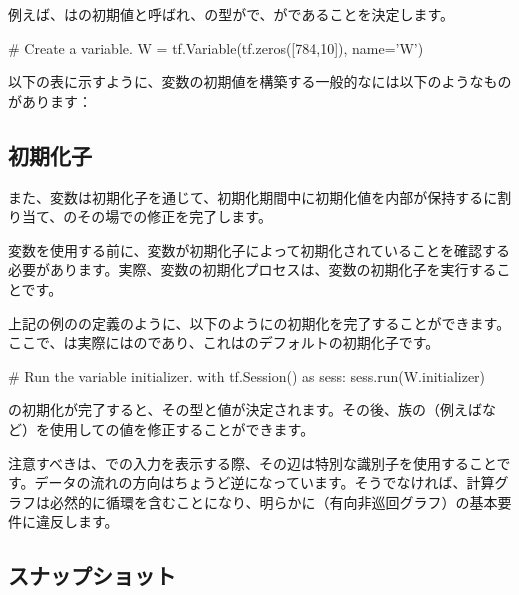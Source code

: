 \begin{content}
例えば、はの初期値と呼ばれ、の型がで、が\code{[784, 10]}であることを決定します。

\begin{leftbar}
\begin{python}
# Create a variable.
W = tf.Variable(tf.zeros([784,10]), name='W')
\end{python}
\end{leftbar}

以下の表に示すように、変数の初期値を構築する一般的なには以下のようなものがあります：

\subsection{初期化子}

また、変数は初期化子を通じて、初期化期間中に初期化値を内部が保持するに割り当て、のその場での修正を完了します。

変数を使用する前に、変数が初期化子によって初期化されていることを確認する必要があります。実際、変数の初期化プロセスは、変数の初期化子を実行することです。

上記の例のの定義のように、以下のようにの初期化を完了することができます。ここで、は実際にはのであり、これはのデフォルトの初期化子です。

\begin{leftbar}
\begin{python}
# Run the variable initializer.
with tf.Session() as sess:
  sess.run(W.initializer)
\end{python}
\end{leftbar}

の初期化が完了すると、その型と値が決定されます。その後、族の（例えばなど）を使用しての値を修正することができます。

注意すべきは、での入力を表示する際、その辺は特別な識別子を使用することです。データの流れの方向はちょうど逆になっています。そうでなければ、計算グラフは必然的に循環を含むことになり、明らかに（有向非巡回グラフ）の基本要件に違反します。

\subsection{スナップショット}


\end{content}
